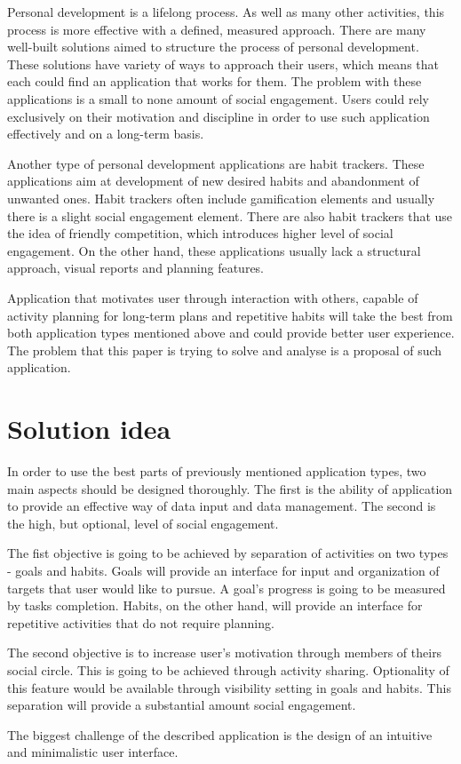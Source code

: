 Personal development is a lifelong process.
As well as many other activities, this process is more effective with a defined, measured approach.
There are many well-built solutions aimed to structure the process of personal development.
These solutions have variety of ways to approach their users, which means that each could find an application that works for them.
The problem with these applications is a small to none amount of social engagement.
Users could rely exclusively on their motivation and discipline in order to use such application effectively and on a long-term basis.

Another type of personal development applications are habit trackers.
These applications aim at development of new desired habits and abandonment of unwanted ones.
Habit trackers often include gamification elements and usually there is a slight social engagement element.
There are also habit trackers that use the idea of friendly competition, which introduces higher level of social engagement.
On the other hand, these applications usually lack a structural approach, visual reports and planning features.

Application that motivates user through interaction with others, capable of activity planning for long-term plans and repetitive habits
will take the best from both application types mentioned above and could provide better user experience.
The problem that this paper is trying to solve and analyse is a proposal of such application.


\section{Solution idea}\label{sec:solution-idea}

In order to use the best parts of previously mentioned application types, two main aspects should be designed thoroughly.
The first is the ability of application to provide an effective way of data input and data management.
The second is the high, but optional, level of social engagement.

The fist objective is going to be achieved by separation of activities on two types - goals and habits.
Goals will provide an interface for input and organization of targets that user would like to pursue.
A goal's progress is going to be measured by tasks completion.
Habits, on the other hand, will provide an interface for repetitive activities that do not require planning.

The second objective is to increase user's motivation through members of theirs social circle.
This is going to be achieved through activity sharing.
Optionality of this feature would be available through visibility setting in goals and habits.
This separation will provide a substantial amount social engagement.

The biggest challenge of the described application is the design of an intuitive and minimalistic user interface.
